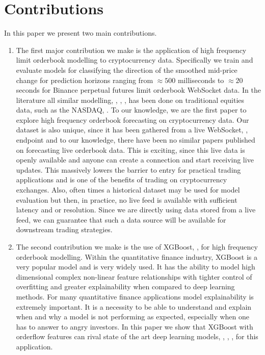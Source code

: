 \section{Contributions}
In this paper we present two main contributions.
\begin{enumerate}
    \item The first major contribution we make is the application of high frequency limit orderbook modelling to cryptocurrency data.
        Specifically we train and evaluate models for classifying the direction of the smoothed mid-price change for prediction horizons ranging from
        $\approx 500$ milliseconds to $\approx 20$ seconds for Binance perpetual futures limit orderbook WebSocket data.
    In the literature all similar modelling, \cite{ZHANG2019}, \cite{KOLM2023}, \cite{LUCCHESE2024}, has been done on traditional equities data, such as the NASDAQ, \cite{LOBSTER2011}.
    To our knowledge, we are the first paper to explore high frequency orderbook forecasting on cryptocurrency data.
    Our dataset is also unique, since it has been gathered from a live WebSocket, \cite{WEBSOCKET2011}, endpoint and to our knowledge,
    there have been no similar papers published on forecasting live orderbook data.
    This is exciting, since this live data is openly available and anyone can create a connection and start receiving
    live updates. This massively lowers the barrier to entry for practical trading applications and is one of the benefits
    of trading on cryptocurrency exchanges. Also, often times a historical dataset may be used for model evaluation but then,
    in practice, no live feed is available with sufficient latency and or resolution. Since we are directly using data
    stored from a live feed, we can guarantee that such a data source will be available for downstream trading strategies.
    \item The second contribution we make is the use of XGBoost, \cite{XGBOOST2016}, for high frequency orderbook modelling. 
    Within the quantitative finance industry, XGBoost is a very popular model and is very widely used. 
    It has the ability to model high dimensional complex non-linear feature relationships with tighter control of overfitting
    and greater explainability when compared to deep learning methods. For many quantitative finance applications model explainability
    is extremely important. It is a necessity to be able to understand and explain when and why a model is not performing as expected,
    especially when one has to answer to angry investors.
    In this paper we show that XGBoost with orderflow features can rival state of the art deep learning models, \cite{ZHANG2019}, \cite{KOLM2023}, \cite{LUCCHESE2024}, for this application.
\end{enumerate}



